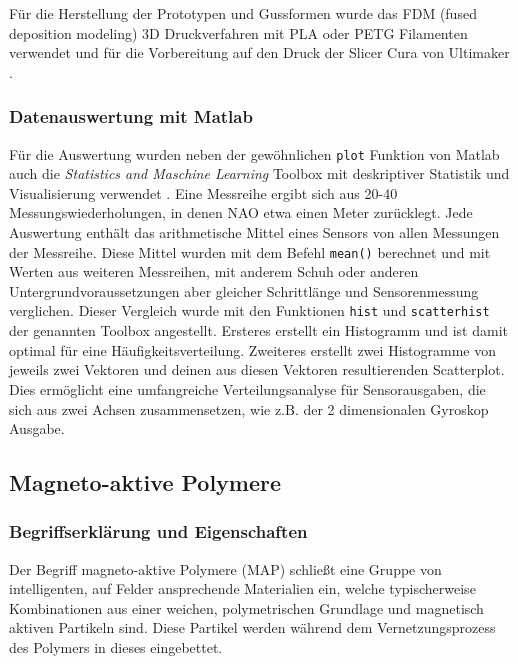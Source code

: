 Für die Herstellung der Prototypen und Gussformen wurde das FDM (fused deposition modeling) 3D Druckverfahren mit PLA oder PETG Filamenten verwendet und für die Vorbereitung auf den Druck der Slicer Cura von Ultimaker \cite{cura}.

\subsubsection*{Datenauswertung mit Matlab}
Für die Auswertung wurden neben der gewöhnlichen \texttt{plot} Funktion von Matlab \cite{matlab} auch die \textit{Statistics and Maschine Learning} Toolbox mit deskriptiver Statistik und Visualisierung verwendet \cite{toolbox}. 
Eine Messreihe ergibt sich aus 20-40 Messungswiederholungen, in denen NAO etwa einen Meter zurücklegt. Jede Auswertung enthält das arithmetische Mittel eines Sensors von allen Messungen der Messreihe. Diese Mittel wurden mit dem Befehl \texttt{mean()} berechnet und mit Werten aus weiteren Messreihen, mit anderem Schuh oder anderen Untergrundvoraussetzungen aber gleicher Schrittlänge und Sensorenmessung verglichen. Dieser Vergleich wurde mit den Funktionen \texttt{hist} und \texttt{scatterhist} der genannten Toolbox angestellt. Ersteres erstellt ein Histogramm und ist damit optimal für eine Häufigkeitsverteilung. Zweiteres erstellt zwei Histogramme von jeweils zwei Vektoren und deinen aus diesen Vektoren resultierenden Scatterplot. Dies ermöglicht eine umfangreiche Verteilungsanalyse für Sensorausgaben, die sich aus zwei Achsen zusammensetzen, wie z.B. der 2 dimensionalen Gyroskop Ausgabe.

\FloatBarrier
\subsection{Magneto-aktive Polymere}\label{kap_MAP}
\subsubsection*{Begriffserklärung und Eigenschaften}
Der Begriff magneto-aktive Polymere (MAP) schließt eine Gruppe von intelligenten, auf Felder ansprechende Materialien ein, welche typischerweise Kombinationen aus einer weichen, polymetrischen Grundlage und magnetisch aktiven Partikeln sind. Diese Partikel werden während dem Vernetzungsprozess des Polymers in dieses eingebettet. 

